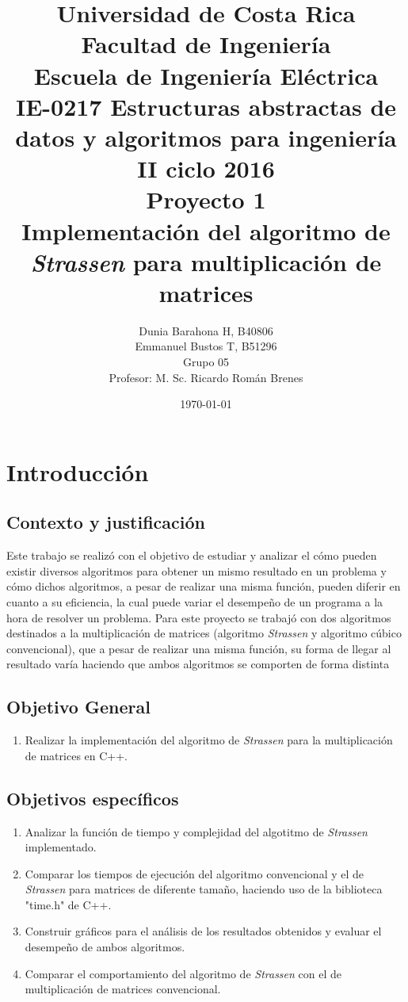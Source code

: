 \documentclass[12pt,letterpaper]{article}
\title{
Universidad de Costa Rica\\
{\small Facultad de Ingeniería\\
Escuela de Ingeniería Eléctrica\\
IE-0217 Estructuras abstractas de datos y algoritmos para ingeniería\\
II ciclo 2016\\
\vspace*{0.7in}} Proyecto 1\\ Implementación del algoritmo de \textit{Strassen} para multiplicación de matrices
\vspace*{0.7in}
}
\author{
Dunia Barahona H, B40806\\
Emmanuel Bustos T, B51296\\{\small Grupo 05}\\
Profesor: M. Sc. Ricardo Román Brenes \vspace*{0.7in}
}
\date{\today\vspace*{0.7in}}  	\setcounter{secnumdepth}{5}
\begin{document}

\maketitle

\newpage
\tableofcontents
\newpage
\listoffigures

\newpage 
\section{Introducción}
\subsection{Contexto y justificación}
Este trabajo se realizó con el objetivo de estudiar y analizar el cómo pueden existir diversos algoritmos para obtener un mismo resultado en un problema y cómo dichos algoritmos, a pesar de realizar una misma función, pueden diferir en cuanto a su eficiencia, la cual puede variar el desempeño de un programa a la hora de resolver un problema. Para este proyecto se trabajó con dos algoritmos destinados a la multiplicación de matrices (algoritmo \textit{Strassen} y algoritmo cúbico convencional), que a pesar de realizar una misma función, su forma de llegar al resultado varía haciendo que ambos algoritmos se comporten de forma distinta
\subsection{Objetivo General}
\begin{enumerate}
\item Realizar la implementación del algoritmo de \textit{Strassen} para la multiplicación de matrices en C++. 
\end{enumerate}
\subsection{Objetivos específicos}
\begin{enumerate}
\item Analizar la función de tiempo y complejidad del algotitmo de \textit{Strassen} implementado.
\item Comparar los tiempos de ejecución del algoritmo convencional y el de \textit{Strassen} para matrices de diferente tamaño, haciendo uso de la biblioteca "time.h" de C++.  
\item Construir gráficos para el análisis de los resultados obtenidos y evaluar el desempeño de ambos algoritmos.
\item Comparar el comportamiento del algoritmo de \textit{Strassen} con el de multiplicación de matrices convencional.
\end{enumerate}
\end{document}
